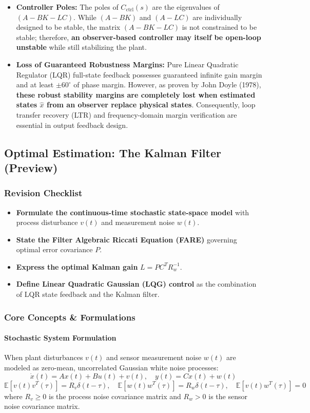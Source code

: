 \documentclass[12pt,onecolumn,twoside ]{article}
\begin{document}
	\begin{itemize}
		\item
		\textbf{Controller Poles:} The poles of $C_{\text{ctrl}}(s)$ are the eigenvalues of $(A - BK - LC)$. While $(A - BK)$ and $(A - LC)$ are individually designed to be stable, the matrix $(A - BK - LC)$ is not constrained to be stable; therefore, \textbf{an observer-based controller may itself be open-loop unstable} while still stabilizing the plant.
		\item
		\textbf{Loss of Guaranteed Robustness Margins:} Pure Linear Quadratic Regulator (LQR) full-state feedback possesses guaranteed infinite gain margin and at least $\pm 60^\circ$ of phase margin. However, as proven by John Doyle (1978), \textbf{these robust stability margins are completely lost when estimated states $\hat{x}$ from an observer replace physical states}. Consequently, loop transfer recovery (LTR) and frequency-domain margin verification are essential in output feedback design.
	\end{itemize}
	
	\subsection{Optimal Estimation: The Kalman Filter (Preview)}
	\subsubsection{Revision Checklist}
	\begin{itemize}
		\item[$\square$]
		\textbf{Formulate the continuous-time stochastic state-space model} with process disturbance $v(t)$ and measurement noise $w(t)$.
		\item[$\square$]
		\textbf{State the Filter Algebraic Riccati Equation (FARE)} governing optimal error covariance $P$.
		\item[$\square$]
		\textbf{Express the optimal Kalman gain} $L = P C^T R_w^{-1}$.
		\item[$\square$]
		\textbf{Define Linear Quadratic Gaussian (LQG) control} as the combination of LQR state feedback and the Kalman filter.
	\end{itemize}
	
	\subsubsection{Core Concepts \& Formulations}
	\paragraph{Stochastic System Formulation}
	When plant disturbances $v(t)$ and sensor measurement noise $w(t)$ are modeled as zero-mean, uncorrelated Gaussian white noise processes: \[
	\dot{x}(t) = Ax(t) + Bu(t) + v(t), \quad y(t) = Cx(t) + w(t)
	\] \[
	\mathbb{E}[v(t)v^T(\tau)] = R_v \delta(t - \tau), \quad \mathbb{E}[w(t)w^T(\tau)] = R_w \delta(t - \tau), \quad \mathbb{E}[v(t)w^T(\tau)] = 0
	\] where $R_v \ge 0$ is the process noise covariance matrix and $R_w > 0$ is the sensor noise covariance matrix.
\end{document}
